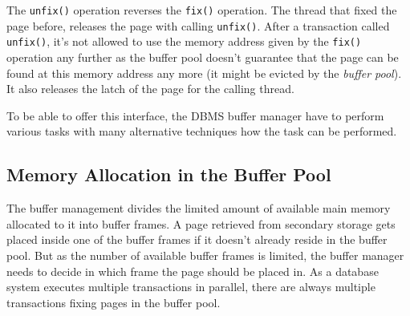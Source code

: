 	The \lstinline{unfix()} operation reverses the \lstinline{fix()} operation. The thread that fixed the page before, releases the page with calling \lstinline{unfix()}. After a transaction called \lstinline{unfix()}, it's not allowed to use the memory address given by the \lstinline{fix()} operation any further as the buffer pool doesn't guarantee that the page can be found at this memory address any more (it might be evicted by the \emph{buffer pool}). It also releases the latch of the page for the calling thread.
	
	To be able to offer this interface, the DBMS buffer manager have to perform various tasks with many alternative techniques how the task can be performed.
	
	
\subsection[Memory Allocation]{Memory Allocation in the Buffer Pool} \label{subsec:allocation}

	The buffer management divides the limited amount of available main memory allocated to it into buffer frames. A page retrieved from secondary storage gets placed inside one of the buffer frames if it doesn't already reside in the buffer pool. But as the number of available buffer frames is limited, the buffer manager needs to decide in which frame the page should be placed in. As a database system executes multiple transactions in parallel, there are always multiple transactions fixing pages in the buffer pool. 
	
